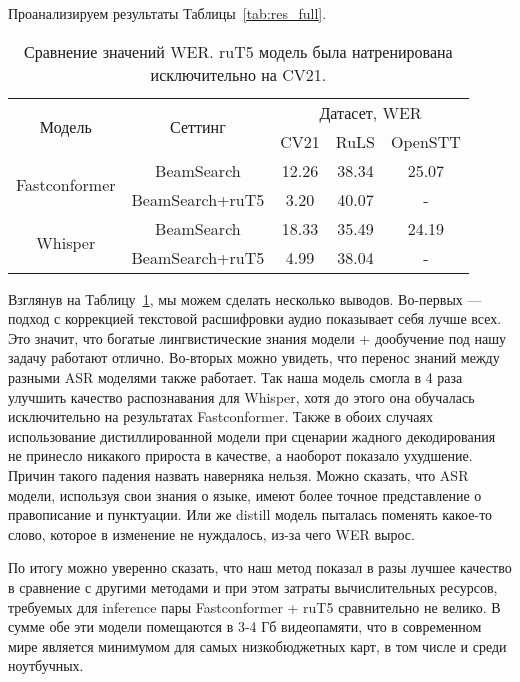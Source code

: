 Проанализируем результаты Таблицы~\ref{tab:res_full}.


\begin{table}[]
\centering
\caption{Сравнение значений WER. ruT5 модель была натренирована исключительно на CV21.}
\begin{tabular}{|c|c|ccc|}
\hline
\multirow{2}{*}{Модель}        & \multirow{2}{*}{Сеттинг}             & \multicolumn{3}{c|}{Датасет, WER}                                    \\ \cline{3-5} 
                               &                                      & \multicolumn{1}{c|}{CV21}  & \multicolumn{1}{c|}{RuLS}     & OpenSTT \\ \hline
\multirow{2}{*}{Fastconformer} & BeamSearch                           & \multicolumn{1}{c|}{12.26} & \multicolumn{1}{c|}{38.34}    & 25.07   \\ \cline{2-5} 
                               & BeamSearch+ruT5                      & \multicolumn{1}{c|}{3.20}  & \multicolumn{1}{c|}{40.07}    & -       \\ \hline
\multirow{2}{*}{Whisper}       & BeamSearch                           & \multicolumn{1}{c|}{18.33} & \multicolumn{1}{c|}{35.49}    & 24.19   \\ \cline{2-5} 
                               & BeamSearch+ruT5                      & \multicolumn{1}{c|}{4.99}  & \multicolumn{1}{c|}{38.04}    & -       \\ \hline
\end{tabular}
\label{tab:res_cv_trained}
\end{table}

Взглянув на Таблицу~\ref{tab:res_cv_trained}, мы можем сделать несколько выводов.
Во-первых — подход с коррекцией текстовой расшифровки аудио показывает себя лучше всех.
Это значит, что богатые лингвистические знания модели + дообучение под нашу задачу работают отлично.
Во-вторых можно увидеть, что перенос знаний между разными ASR моделями также работает.
Так наша модель смогла в 4 раза улучшить качество распознавания для Whisper, хотя до этого она обучалась исключительно на результатах Fastconformer.
Также в обоих случаях использование дистиллированной модели при сценарии жадного декодирования не принесло никакого прироста в качестве, а наоборот показало ухудшение. Причин такого падения назвать наверняка нельзя.
Можно сказать, что ASR модели, используя свои знания о языке, имеют более точное представление о правописание и пунктуации.
Или же distill модель пыталась поменять какое-то слово, которое в изменение не нуждалось, из-за чего WER вырос.



По итогу можно уверенно сказать, что наш метод показал в разы лучшее качество в сравнение с другими методами и при этом затраты вычислительных ресурсов, требуемых для inference пары Fastconformer + ruT5 сравнительно не велико.
В сумме обе эти модели помещаются в 3-4 Гб видеопамяти, что в современном мире является минимумом для самых низкобюджетных карт, в том числе и среди ноутбучных.
